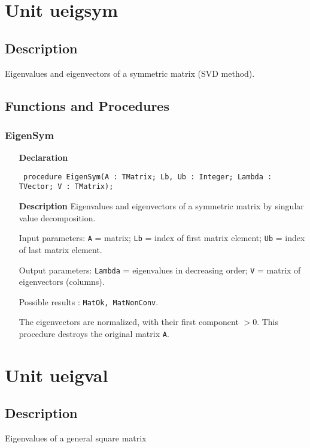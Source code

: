 \documentclass[12pt,a4paper,oneside]{report}
\newcommand{\declarationitem}[1]{\textbf{#1}}
\newcommand{\descriptiontitle}[1]{\textbf{#1}}
\newcommand{\code}[1]{\texttt{#1}}
\begin{document}
\section{Unit ueigsym}
\label{ueigsym}
\subsection{Description}
Eigenvalues and eigenvectors of a symmetric matrix (SVD method).
\subsection{Functions and Procedures}
\subsubsection{EigenSym}
\label{ueigsym-EigenSym}
\begin{itemize}\item[\declarationitem{Declaration}\hfill]
	\begin{flushleft}
		\code{
			procedure EigenSym(A : TMatrix; Lb, Ub : Integer; Lambda : TVector; V : TMatrix);}
		
	\end{flushleft}
	
	\par
	\item[\descriptiontitle{Description}]
	Eigenvalues and eigenvectors of a symmetric matrix by singular value decomposition.
	
	Input parameters: \code{A} = matrix; \code{Lb} = index of first matrix element; \code{Ub} = index of last matrix element.
	
	Output parameters: \code{Lambda} = eigenvalues in decreasing order; \code{V} = matrix of eigenvectors (columns).
	
	Possible results : \code{MatOk, MatNonConv}.
	
	The eigenvectors are normalized, with their first component $ > 0$. This procedure destroys the original matrix \code{A}.
	
\end{itemize}
\section{Unit ueigval}
\label{ueigval}
\subsection{Description}
Eigenvalues of a general square matrix
\end{document}
